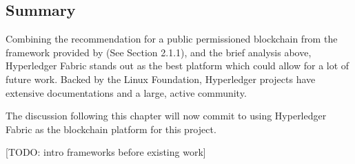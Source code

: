 \subsection*{Summary}

Combining the recommendation for a public permissioned blockchain from the framework provided 
by \citet{wust2017you} (See Section 2.1.1), and the brief analysis above, Hyperledger Fabric 
stands out as the best platform which could allow for a lot of future work. Backed by the 
Linux Foundation, Hyperledger projects have extensive documentations and a large, 
active community. 

The discussion following this chapter will now commit to using Hyperledger 
Fabric as the blockchain platform for this project.

[TODO: intro frameworks before existing work]

